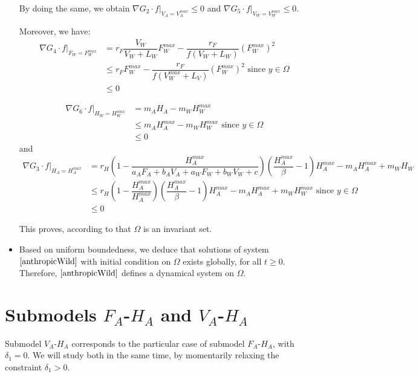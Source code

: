 \documentclass{article}
\begin{document}
\begin{itemize}
By doing the same, we obtain $\nabla G_2 \cdot f |_{V_A = V_A^{max}} \leq 0$ and $\nabla G_5 \cdot f |_{V_W = V_W^{max}} \leq 0$.

Moreover, we have:
\begin{align*}
\nabla G_4 \cdot f |_{F_W = F_W^{max}} &=  r_F \dfrac{V_W}{V_W + L_W} F_W^{max} - \dfrac{r_F}{f(V_W + L_W)} (F_W^{max})^2\\
& \leq r_F F_W^{max} - \dfrac{r_F}{f(V_W^{max} + L_V)} (F_W^{max})^2 \text{ since $y \in \Omega$}\\
& \leq 0
\end{align*}

\begin{align*}
\nabla G_6 \cdot f |_{H_W = H_W^{max}} &=  m_AH_A - m_WH_W^{max}\\
& \leq m_AH_A^{max} - m_WH_W^{max} \text{ since $y \in \Omega$}\\
& \leq 0
\end{align*}
and
\begin{align*}
\nabla G_3 \cdot f |_{H_A = H_A^{max}} &= r_{H}\left(1-\dfrac{H_A^{max}}{a_{A}F_{A} + b_A V_A + a_W F_W + b_W V_W + c}\right)\left(\dfrac{H_A^{max}}{\beta}-1\right)H_A^{max} -m_A H_A^{max} + m_W H_W \\
& \leq r_{H}\left(1-\dfrac{H_A^{max}}{H_A^{max}}\right)\left(\dfrac{H_A^{max}}{\beta}-1\right)H_A^{max} -m_A H_A^{max} + m_W H_W^{max} \text{ since $y \in \Omega$}\\
& \leq 0
\end{align*}

This proves, according to \cite{smoller_shock_1994} that $\Omega$ is an invariant set.

\item Based on uniform boundedness, we deduce that solutions of system $\eqref{anthropicWild}$ with initial condition on $\Omega$ exists globally, for all $t\geq 0$. Therefore, $\eqref{anthropicWild}$ defines a dynamical system on $\Omega$.



\end{itemize}


\section{Submodels $F_A$-$H_A$ and $V_A$-$H_A$ \label{sec:anthropicFAHA}}
Submodel $V_A$-$H_A$ corresponds to the particular case of submodel $F_A$-$H_A$, with $\delta_1 = 0$. We will study both in the same time, by momentarily relaxing the constraint $\delta_1 > 0$.
\end{document}
